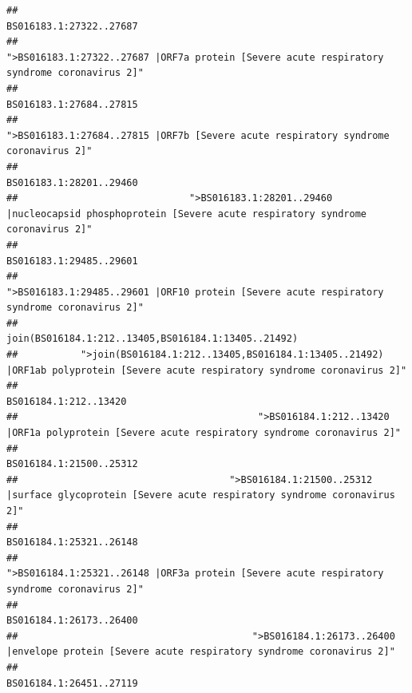 \documentclass[
]{article}
\begin{document}
\begin{verbatim}
##                                                                                                                BS016183.1:27322..27687 
##                                            ">BS016183.1:27322..27687 |ORF7a protein [Severe acute respiratory syndrome coronavirus 2]" 
##                                                                                                                BS016183.1:27684..27815 
##                                                    ">BS016183.1:27684..27815 |ORF7b [Severe acute respiratory syndrome coronavirus 2]" 
##                                                                                                                BS016183.1:28201..29460 
##                              ">BS016183.1:28201..29460 |nucleocapsid phosphoprotein [Severe acute respiratory syndrome coronavirus 2]" 
##                                                                                                                BS016183.1:29485..29601 
##                                            ">BS016183.1:29485..29601 |ORF10 protein [Severe acute respiratory syndrome coronavirus 2]" 
##                                                                                    join(BS016184.1:212..13405,BS016184.1:13405..21492) 
##           ">join(BS016184.1:212..13405,BS016184.1:13405..21492) |ORF1ab polyprotein [Severe acute respiratory syndrome coronavirus 2]" 
##                                                                                                                  BS016184.1:212..13420 
##                                          ">BS016184.1:212..13420 |ORF1a polyprotein [Severe acute respiratory syndrome coronavirus 2]" 
##                                                                                                                BS016184.1:21500..25312 
##                                     ">BS016184.1:21500..25312 |surface glycoprotein [Severe acute respiratory syndrome coronavirus 2]" 
##                                                                                                                BS016184.1:25321..26148 
##                                            ">BS016184.1:25321..26148 |ORF3a protein [Severe acute respiratory syndrome coronavirus 2]" 
##                                                                                                                BS016184.1:26173..26400 
##                                         ">BS016184.1:26173..26400 |envelope protein [Severe acute respiratory syndrome coronavirus 2]" 
##                                                                                                                BS016184.1:26451..27119 

\end{verbatim}
\end{document}
